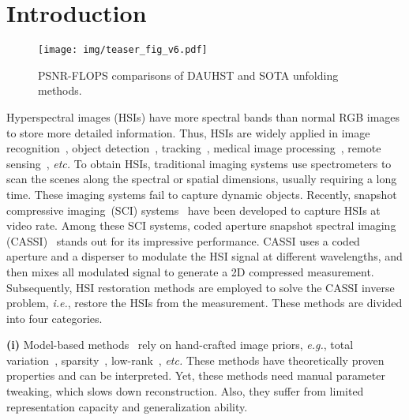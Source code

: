 \documentclass{article}
\begin{document}
\section{Introduction}
\vspace{-3mm}
\begin{wrapfigure}{r}{0.37\textwidth}
	\vspace{-7mm}
	\begin{center} \hspace{-1.5mm}
		\texttt{[image: img/teaser\_fig\_v6.pdf]}
	\end{center}
	\vspace{-4mm}
	\caption{\small PSNR-FLOPS comparisons of DAUHST and SOTA unfolding methods.}
	\vspace{-2mm}
	\label{fig:teaser}
\end{wrapfigure} 
Hyperspectral images (HSIs) have more spectral bands than normal RGB images to store more detailed information. Thus, HSIs are widely applied in image recognition~\cite{fauvel2012advances,maggiori2017recurrent,zhang2015scene}, object detection~\cite{ot_1,ot_2,ot_3}, tracking~\cite{fu2016exploiting,uzkent2016real,uzkent2017aerial}, medical image processing~\cite{mi_1,mi_2,mi_3}, remote sensing~\cite{rs_1,rs_2,rs_3,rs_4}, \emph{etc.} To obtain HSIs,  traditional imaging systems use spectrometers to scan the scenes along the spectral or spatial dimensions, usually requiring a long time. These imaging systems fail to capture dynamic objects. Recently, snapshot compressive imaging~(SCI) systems~\cite{sci_1,sci_2,sci_3,sci_5,sci_6,yuan2015compressive,ma2021led} have been developed to capture HSIs at video rate. Among these SCI systems, coded aperture snapshot spectral imaging (CASSI)~\cite{sci_2,tsa_net,gehm2007single} stands out for its impressive performance. CASSI uses a coded aperture and a disperser to modulate the HSI signal at different wavelengths, and then mixes all modulated signal to generate a 2D compressed measurement. Subsequently, HSI restoration methods are employed to solve the CASSI inverse problem, \emph{i.e.}, restore the HSIs from the measurement. 
These methods are divided into four categories.

\textbf{(i)} Model-based  methods~\cite{sci_2,sparse_1,desci,non_local_1,non_local_2,gap_tv,tra_rela_1,gradient} rely on hand-crafted image priors, \emph{e.g.}, total variation~\cite{gap_tv}, sparsity~\cite{sci_2,sparse_1}, low-rank~\cite{desci}, \emph{etc.} These methods have theoretically proven properties and can be interpreted. Yet, these methods need manual parameter tweaking, which slows down  reconstruction. Also, they suffer from limited representation capacity and generalization ability. 
\end{document}
